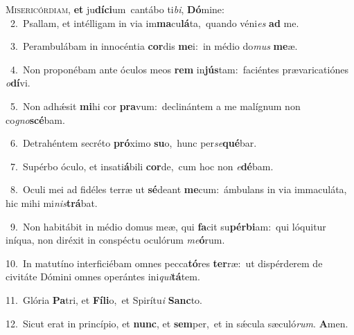 \lettrine{\initial\textcolor{\initialcolor}{M}}{isericórdiam,} \textbf{et} ju\-\textbf{dí}\-\textbf{ci}um~\star cantábo ti\-\textit{bi}\-, \textbf{Dó}\-mine:\\
{\numbfont\textcolor{\numbcolor}{~2.}}~Psallam, et intélligam in via im\-\textbf{ma}\-cu\-\textbf{lá}\-ta,~\star quando véni\textit{es} \textbf{ad} me.\par
{\numbfont\textcolor{\numbcolor}{~3.}}~Perambulábam in innocéntia \textbf{cor}\-dis \textbf{me}\-i:~\star in médio do\textit{mus} \textbf{me}\-æ.\par
{\numbfont\textcolor{\numbcolor}{~4.}}~Non proponébam ante óculos meos \textbf{rem} in\-\textbf{jús}\-tam:~\star faciéntes prævaricatiónes \textit{o}\-\textbf{dí}vi.\par
{\numbfont\textcolor{\numbcolor}{~5.}}~Non adhǽsit \textbf{mi}\-hi cor \textbf{pra}\-vum:~\star declinántem a me malígnum non co\-\textit{gno}\-\textbf{scé}bam.\par
{\numbfont\textcolor{\numbcolor}{~6.}}~Detrahéntem secréto \textbf{pró}\-ximo \textbf{su}\-o,~\star hunc per\-\textit{se}\-\textbf{qué}bar.\par
{\numbfont\textcolor{\numbcolor}{~7.}}~Supérbo óculo, et insati\-\textbf{á}\-bili \textbf{cor}\-de,~\star cum hoc non \textit{e}\-\textbf{dé}bam.\par
{\numbfont\textcolor{\numbcolor}{~8.}}~Oculi mei ad fidéles terræ ut \textbf{sé}\-deant \textbf{me}\-cum:~\star ámbulans in via immaculáta, hic mihi mi\-\textit{nis}\-\textbf{trá}bat.\par
{\numbfont\textcolor{\numbcolor}{~9.}}~Non habitábit in médio domus meæ, qui \textbf{fa}\-cit su\-\textbf{pér}\-\textbf{bi}am:~\star qui lóquitur iníqua, non diréxit in conspéctu oculórum \textit{me}\-\textbf{ó}rum.\par
{\numbfont\textcolor{\numbcolor}{10.}}~In matutíno interficiébam omnes pecca\-\textbf{tó}\-res \textbf{ter}\-ræ:~\star ut dispérderem de civitáte Dómini omnes operántes ini\-\textit{qui}\-\textbf{tá}tem.\par
{\numbfont\textcolor{\numbcolor}{11.}}~Glória \textbf{Pa}\-tri, et \textbf{Fí}\-\textbf{li}o,~\star et Spirítu\textit{i} \textbf{Sanc}\-to.\par
{\numbfont\textcolor{\numbcolor}{12.}}~Sicut erat in princípio, et \textbf{nunc}\-, et \textbf{sem}\-per,~\star et in sǽcula sæculó\-\textit{rum}\-. \textbf{A}\-men.\par
